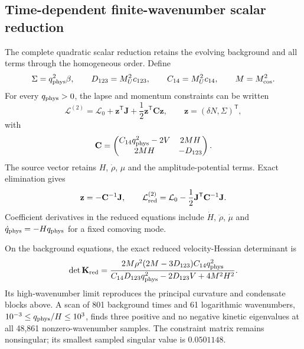 \subsection{Time-dependent finite-wavenumber scalar reduction}

The complete quadratic scalar reduction retains the evolving background and
all terms through the homogeneous order.  Define
\begin{equation}
 \Sigma=q_{\rm phys}^2\beta,\qquad
 D_{123}=M_U^2c_{123},\qquad C_{14}=M_U^2c_{14},\qquad
 M=M_{\rm cos}^2.
 \label{eq:finite-q-definitions}
\end{equation}
For every $q_{\rm phys}>0$, the lapse and momentum constraints can be written
\begin{equation}
 \mathcal L^{(2)}=\mathcal L_0+\mathbf z^{\mathsf T}\mathbf J
 +\frac12\mathbf z^{\mathsf T}\mathbf C\mathbf z,
 \qquad \mathbf z=(\delta N,\Sigma)^{\mathsf T},
 \label{eq:finite-q-constraint-form}
\end{equation}
with
\begin{equation}
 \mathbf C=
 \begin{pmatrix}
 C_{14}q_{\rm phys}^2-2V & 2MH\\
 2MH & -D_{123}
 \end{pmatrix}.
 \label{eq:finite-q-constraint-matrix}
\end{equation}
The source vector retains $H$, $\dot\rho$, $\mu$ and the amplitude-potential
terms.  Exact elimination gives
\begin{equation}
 \mathbf z=-\mathbf C^{-1}\mathbf J,
 \qquad
 \mathcal L_{\rm red}^{(2)}=\mathcal L_0
 -\frac12\mathbf J^{\mathsf T}\mathbf C^{-1}\mathbf J.
 \label{eq:finite-q-schur}
\end{equation}
Coefficient derivatives in the reduced equations include $\dot H$,
$\ddot\rho$, $\dot\mu$ and
$\dot q_{\rm phys}=-Hq_{\rm phys}$ for a fixed comoving mode.

On the background equations, the exact reduced velocity-Hessian determinant is
\begin{equation}
 \det\mathbf K_{\rm red}=
 \frac{2M\rho^2(2M-3D_{123})C_{14}q_{\rm phys}^2}
 {C_{14}D_{123}q_{\rm phys}^2-2D_{123}V+4M^2H^2}.
 \label{eq:finite-q-kinetic-determinant}
\end{equation}
Its high-wavenumber limit reproduces the principal curvature and condensate
blocks above.  A scan of 801 background times and 61 logarithmic wavenumbers,
$10^{-3}\le q_{\rm phys}/H\le10^3$, finds three positive and no negative
kinetic eigenvalues at all 48,861 nonzero-wavenumber samples.  The constraint
matrix remains nonsingular; its smallest sampled singular value is
$0.0501148$.

